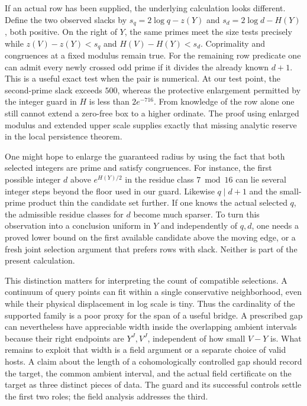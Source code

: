 \documentclass[12pt,letterpaper]{article}
\begin{document}
If an actual row has been supplied, the underlying calculation looks different. Define the two observed slacks by \(s_q=2\log q-z(Y)\) and \(s_d=2\log d-H(Y)\), both positive. On the right of \(Y\), the same primes meet the size tests precisely while \(z(V)-z(Y)<s_q\) and \(H(V)-H(Y)<s_d\). Coprimality and congruences at a fixed modulus remain true. For the remaining row predicate one can admit every newly crossed odd prime if it divides the already known \(d+1\). This is a useful exact test when the pair is numerical. At our test point, the second-prime slack exceeds \(500\), whereas the protective enlargement permitted by the integer guard in \(H\) is less than \(2e^{-716}\). From knowledge of the row alone one still cannot extend a zero-free box to a higher ordinate. The proof using enlarged modulus and extended upper scale supplies exactly that missing analytic reserve in the local persistence theorem.

One might hope to enlarge the guaranteed radius by using the fact that both selected integers are prime and satisfy congruences. For instance, the first possible integer \(d\) above \(e^{H(Y)/2}\) in the residue class \(7\bmod16\) can lie several integer steps beyond the floor used in our guard. Likewise \(q\mid d+1\) and the small-prime product thin the candidate set further. If one knows the actual selected \(q\), the admissible residue classes for \(d\) become much sparser. To turn this observation into a conclusion uniform in \(Y\) and independently of \(q,d\), one needs a proved lower bound on the first available candidate above the moving edge, or a fresh joint selection argument that prefers rows with slack. Neither is part of the present calculation.

This distinction matters for interpreting the count of compatible selections. A continuum of query points can fit within a single conservative neighborhood, even while their physical displacement in log scale is tiny. Thus the cardinality of the supported family is a poor proxy for the span of a useful bridge. A prescribed gap can nevertheless have appreciable width inside the overlapping ambient intervals because their right endpoints are \(Y^J,V^J\), independent of how small \(V-Y\) is. What remains to exploit that width is a field argument or a separate choice of valid hosts. A claim about the length of a cohomologically controlled gap should record the target, the common ambient interval, and the actual field certificate on the target as three distinct pieces of data. The guard and its successful controls settle the first two roles; the field analysis addresses the third.
\end{document}
